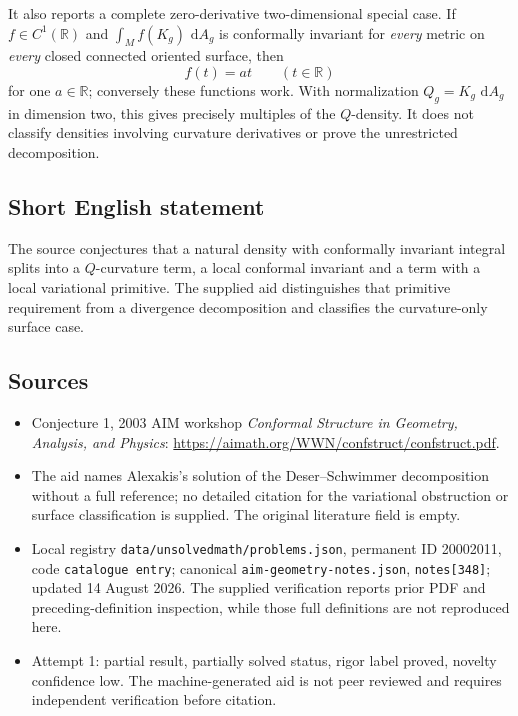 \documentclass[11pt]{article}
\newcommand{\R}{\mathbb{R}}
\newcommand{\dd}{\,\mathrm{d}}
\begin{document}
It also reports a complete zero-derivative two-dimensional special case. If \(f\in C^1(\R)\) and \(\int_Mf(K_g)\,\dd A_g\) is conformally invariant for \emph{every} metric on \emph{every} closed connected oriented surface, then
\[
f(t)=at\qquad(t\in\R)
\]
for one \(a\in\R\); conversely these functions work. With normalization \(Q_g=K_g\,\dd A_g\) in dimension two, this gives precisely multiples of the \(Q\)-density. It does not classify densities involving curvature derivatives or prove the unrestricted decomposition.
\subsection{Short English statement}
The source conjectures that a natural density with conformally invariant integral splits into a \(Q\)-curvature term, a local conformal invariant and a term with a local variational primitive. The supplied aid distinguishes that primitive requirement from a divergence decomposition and classifies the curvature-only surface case.
\subsection{Sources}
\begin{itemize}
\item Conjecture 1, 2003 AIM workshop \emph{Conformal Structure in Geometry, Analysis, and Physics}: \url{https://aimath.org/WWN/confstruct/confstruct.pdf}.
\item The aid names Alexakis's solution of the Deser--Schwimmer decomposition without a full reference; no detailed citation for the variational obstruction or surface classification is supplied. The original literature field is empty.
\item Local registry \texttt{data/unsolvedmath/problems.json}, permanent ID 20002011, code \texttt{catalogue entry}; canonical \texttt{aim-geometry-notes.json}, \texttt{notes[348]}; updated 14 August 2026. The supplied verification reports prior PDF and preceding-definition inspection, while those full definitions are not reproduced here.
\item Attempt 1: partial result, partially solved status, rigor label proved, novelty confidence low. The machine-generated aid is not peer reviewed and requires independent verification before citation.
\end{itemize}
\end{document}
